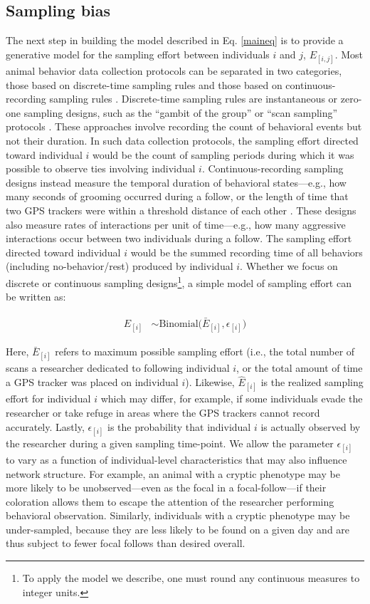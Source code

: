 \documentclass[Afour,sageh,times]{sagej}
\begin{document}
\subsection{Sampling bias}
The next step in building the model described in Eq. \ref{maineq} is to provide a generative model for the sampling effort between individuals $i$ and $j$, $E_{[i,j]}$. Most animal behavior data collection protocols can be separated in two categories, those based on discrete-time sampling rules and those based on continuous-recording sampling rules \citep{bateson2021measuring}. Discrete-time sampling rules are instantaneous or zero-one sampling designs, such as the ``gambit of the group'' or ``scan sampling'' protocols \citep[see:][for further details]{sosa2021reliable}. These approaches involve recording the count of behavioral events but not their duration. In such data collection protocols, the sampling effort directed toward individual $i$ would be the count of sampling periods during which it was possible to observe ties involving individual $i$. Continuous-recording sampling designs instead measure the temporal duration of behavioral states---e.g., how many seconds of grooming occurred during a follow, or the length of time that two GPS trackers were within a threshold distance of each other \citep{he2023guide}. These designs also measure rates of interactions per unit of time---e.g., how many aggressive interactions occur between two individuals during a follow. The sampling effort directed toward individual $i$ would be the summed recording time of all behaviors (including no-behavior/rest) produced by individual $i$. Whether we focus on discrete or continuous sampling designs\footnote{To apply the model we describe, one must round any continuous measures to integer units.}, a simple model of sampling effort can be written as:
\begin{ceqn}
\begin{align}\label{eq2}
	\hat E_{[i]} &\sim \mathrm{Binomial}\Big(\bar E_{[i]}, \epsilon_{[i]} \Big)
\end{align}
\end{ceqn}
 Here, $\bar E_{[i]}$ refers to maximum possible sampling effort (i.e., the total number of scans a researcher dedicated to following individual $i$, or the total amount of time a GPS tracker was placed on individual $i$). Likewise, $\hat E_{[i]}$ is the realized sampling effort for individual $i$ which may differ, for example, if some individuals evade the researcher or take refuge in areas where the GPS trackers cannot record accurately. Lastly, $\epsilon_{[i]}$ is the probability that individual $i$ is actually observed by the researcher during a given sampling time-point. We allow the parameter $\epsilon_{[i]}$ to vary as a function of individual-level characteristics that may also influence network structure. For example, an animal with a cryptic phenotype may be more likely to be unobserved---even as the focal in a focal-follow---if their coloration allows them to escape the attention of the researcher performing behavioral observation. Similarly, individuals with a cryptic phenotype may be under-sampled, because they are less likely to be found on a given day and are thus subject to fewer focal follows than desired overall. 
\end{document}

